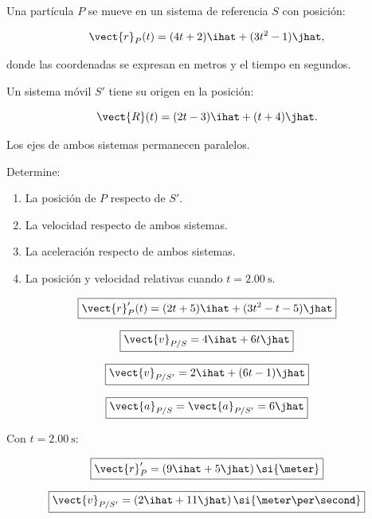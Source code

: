 \begin{ejercicio}
Una partícula \(P\) se mueve en un sistema
de referencia \(S\) con posición:

\[
\vect{r}_P(t)
=
(4t+2)\ihat+(3t^2-1)\jhat,
\]

donde las coordenadas se expresan en metros
y el tiempo en segundos.

Un sistema móvil \(S'\) tiene su origen
en la posición:

\[
\vect{R}(t)
=
(2t-3)\ihat+(t+4)\jhat.
\]

Los ejes de ambos sistemas permanecen paralelos.

Determine:

\begin{enumerate}[label=\alph*)]
    \item La posición de \(P\) respecto de \(S'\).
    \item La velocidad respecto de ambos sistemas.
    \item La aceleración respecto de ambos sistemas.
    \item La posición y velocidad relativas
    cuando \(t=\SI{2.00}{\second}\).
\end{enumerate}
\end{ejercicio}

\begin{respuesta}
\[
\boxed{
\vect{r}'_P(t)
=
(2t+5)\ihat+(3t^2-t-5)\jhat
}
\]

\[
\boxed{
\vect{v}_{P/S}
=
4\ihat+6t\jhat
}
\]

\[
\boxed{
\vect{v}_{P/S'}
=
2\ihat+(6t-1)\jhat
}
\]

\[
\boxed{
\vect{a}_{P/S}
=
\vect{a}_{P/S'}
=
6\jhat
}
\]

Con \(t=\SI{2.00}{\second}\):

\[
\boxed{
\vect{r}'_P
=
(9\ihat+5\jhat)\,\si{\meter}
}
\]

\[
\boxed{
\vect{v}_{P/S'}
=
(2\ihat+11\jhat)\,
\si{\meter\per\second}
}
\]
\end{respuesta}

